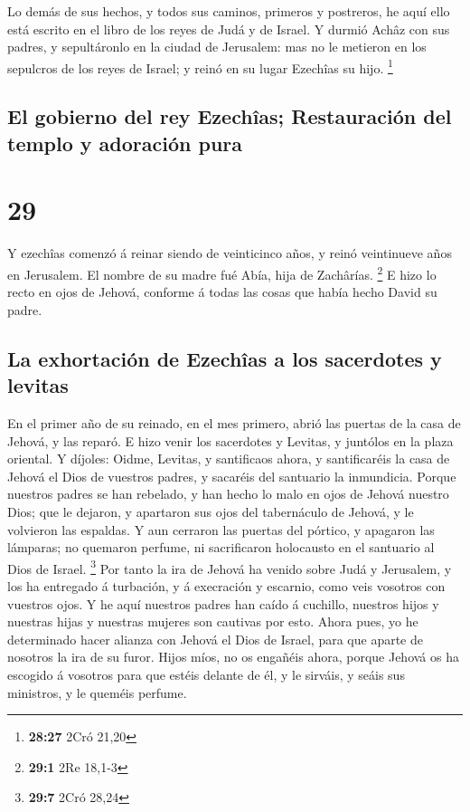  Lo demás de sus hechos, y todos sus caminos, primeros y
postreros, he aquí ello está escrito en el libro de los reyes de Judá y
de Israel.  Y durmió Achâz con sus padres, y sepultáronlo
en la ciudad de Jerusalem: mas no le metieron en los sepulcros de los
reyes de Israel; y reinó en su lugar Ezechîas su hijo. \footnote{\textbf{28:27}
  2Cró 21,20}

\hypertarget{el-gobierno-del-rey-ezechuxeeas-restauraciuxf3n-del-templo-y-adoraciuxf3n-pura}{%
\subsection{El gobierno del rey Ezechîas; Restauración del templo y
adoración
pura}\label{el-gobierno-del-rey-ezechuxeeas-restauraciuxf3n-del-templo-y-adoraciuxf3n-pura}}

\hypertarget{section-28}{%
\section{29}\label{section-28}}

 Y ezechîas comenzó á reinar siendo de veinticinco años, y
reinó veintinueve años en Jerusalem. El nombre de su madre fué Abía,
hija de Zachârías. \footnote{\textbf{29:1} 2Re 18,1-3}  E
hizo lo recto en ojos de Jehová, conforme á todas las cosas que había
hecho David su padre.

\hypertarget{la-exhortaciuxf3n-de-ezechuxeeas-a-los-sacerdotes-y-levitas}{%
\subsection{La exhortación de Ezechîas a los sacerdotes y
levitas}\label{la-exhortaciuxf3n-de-ezechuxeeas-a-los-sacerdotes-y-levitas}}

 En el primer año de su reinado, en el mes primero, abrió
las puertas de la casa de Jehová, y las reparó.  E hizo
venir los sacerdotes y Levitas, y juntólos en la plaza oriental.
 Y díjoles: Oidme, Levitas, y santificaos ahora, y
santificaréis la casa de Jehová el Dios de vuestros padres, y sacaréis
del santuario la inmundicia.  Porque nuestros padres se han
rebelado, y han hecho lo malo en ojos de Jehová nuestro Dios; que le
dejaron, y apartaron sus ojos del tabernáculo de Jehová, y le volvieron
las espaldas.  Y aun cerraron las puertas del pórtico, y
apagaron las lámparas; no quemaron perfume, ni sacrificaron holocausto
en el santuario al Dios de Israel. \footnote{\textbf{29:7} 2Cró 28,24}
 Por tanto la ira de Jehová ha venido sobre Judá y
Jerusalem, y los ha entregado á turbación, y á execración y escarnio,
como veis vosotros con vuestros ojos.  Y he aquí nuestros
padres han caído á cuchillo, nuestros hijos y nuestras hijas y nuestras
mujeres son cautivas por esto.  Ahora pues, yo he
determinado hacer alianza con Jehová el Dios de Israel, para que aparte
de nosotros la ira de su furor.  Hijos míos, no os engañéis
ahora, porque Jehová os ha escogido á vosotros para que estéis delante
de él, y le sirváis, y seáis sus ministros, y le queméis perfume.

